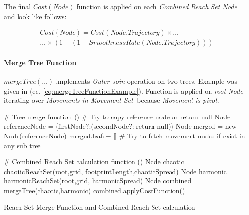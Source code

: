 The final $Cost(Node)$ function is applied on each \emph{Combined Reach Set Node} and look like follows:

\begin{multline}
    Cost(Node) = Cost(Node.Trajectory) \times\dots\\\dots\times \left(1+ \left(1-SmoothnessRate(N ode.T rajectory)\right)\right)
\end{multline}

\paragraph{Merge Tree Function} $mergeTree(\dots)$ implements \emph{Outer Join} operation on two trees. Example was given in (eq. \ref{eq:mergeTreeFunctionExample}).
Function is applied on \emph{root Node} iterating over \emph{Movements in Movement Set}, because \emph{Movement is pivot}.

\begin{algorithm}[H]
    
    \BlankLine
    \# Tree merge function\;
    \Fn(){}{
        \BlankLine
        \# Try to copy reference node or return null\;
        Node referenceNode = (firstNode?:(secondNode?: return null))\;
        Node merged =  new Node(referenceNode)\;
        merged.leafs= []\;
        \BlankLine
        \# Try to fetch movement nodes if exist in any sub tree\;
    }{}
    
    \BlankLine
    \# Combined Reach Set calculation function\;
    \Fn(){}{
        Node chaotic = chaoticReachSet(root,grid, footprintLength,chaoticSpread)\;
        Node harmonic = harmonicReachSet(root,grid, harmonicSpread)\;
        Node combined = mergeTree(chaotic,harmonic)\;
        combined.applyCostFunction()\;
    }

    
    \caption{Reach Set Merge Function and Combined Reach Set calculation}
    \label{alg:ReachSetMerge}
\end{algorithm}


